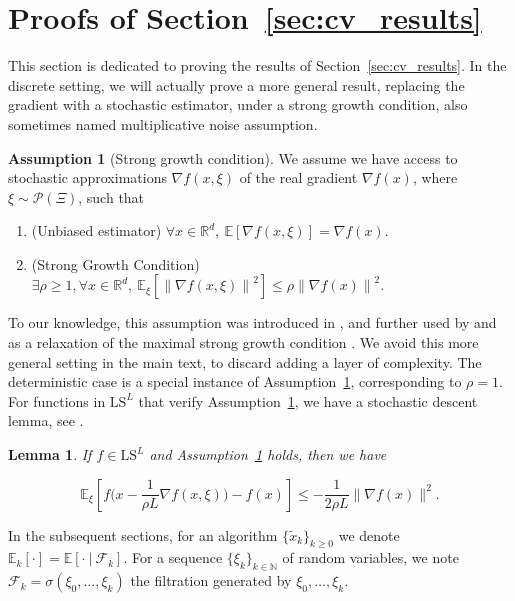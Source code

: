 \documentclass{article}
\def\R{{\mathbb{R}}}
\def\N{{\mathbb{N}}}
\def\xdisc{\{\tilde x_k \}_{k\ge 0}}
\newcommand{\E}[1]{\mathbb{E}\left[#1 \right]}
\newcommand{\condE}[1]{\mathbb{E}_{k}\left[#1 \right]}
\newcommand{\norm}[1]{\left\lVert#1\right\rVert}
\newcommand{\ls}{\text{LS}^{L}}
\theoremstyle{plain}
\newtheorem{lemma}[theorem]{Lemma}
\theoremstyle{definition}
\newtheorem{assumption}[theorem]{Assumption}
\theoremstyle{remark}
\begin{document}
\section{Proofs of Section~\ref{sec:cv_results}}\label{app:cv_results}
This section is dedicated to proving the results of Section~\ref{sec:cv_results}. In the discrete setting, we will actually prove a more general result, replacing the gradient with a stochastic estimator, under a strong growth condition, also sometimes named multiplicative noise assumption.\begin{assumption}[Strong growth condition]\label{ass:sgc}
    We assume we have access to stochastic approximations $\nabla f(x,\xi)$ of the real gradient $\nabla f(x)$, where $\xi \sim \mathcal{P}(\Xi)$, such that
    \begin{enumerate}[label=(\roman*)]
        \item (Unbiased estimator) $\forall x \in \R^d, ~ \E{\nabla f(x,\xi)} = \nabla f(x)$. 
        \item (Strong Growth Condition) $\exists \rho \ge 1, \forall x \in \R^d,~ \mathbb{E}_{\xi}\left[ \norm{\nabla f(x,\xi)}^2 \right] \le \rho \norm{\nabla f(x)}^2$. 
    \end{enumerate} 
\end{assumption}
To our knowledge, this assumption was introduced in \cite{polyak1987introduction}, and further used by \cite{cevher2019linear} and \cite{vaswani2019fast} as a relaxation of the maximal strong growth condition \cite{tseng1998incremental,solodov1998incremental}.
 We avoid this more general setting in the main text, to discard adding a layer of complexity. The deterministic case is a special instance of Assumption~\ref{ass:sgc}, corresponding to $\rho = 1$.
For functions in $\ls$ that verify Assumption~\ref{ass:sgc}, we have a stochastic descent lemma, see \cite[Lemma 16]{gupta2024nesterov}.
\begin{lemma}\label{lem:descent_sgc}
If $f \in \ls$ and Assumption~\ref{ass:sgc} holds, then we have

\begin{equation}
     \mathbb{E}_\xi\left[ f\Big(x-\frac{1}{\rho L}\nabla f(x,\xi)\Big) - f(x) \right] \leq -\frac{1}{2\rho L}\lVert  \nabla f(x) \rVert^2.
\end{equation}
\end{lemma} 
In the subsequent sections, for an algorithm $\xdisc$ we denote $\condE{\cdot} = \E{\cdot \: | \: \mathcal{F}_k }$. For a sequence $\{\xi_k \}_{k\in \N}$ of random variables, we note $\mathcal{F}_k = \sigma(\xi_0,\dots,\xi_k)$ the filtration generated by $\xi_0,\dots,\xi_k$.
\end{document}
